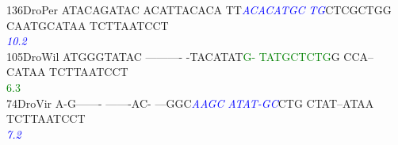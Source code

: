 \documentclass[11pt,twoside,reqno,a4paper]{article}
\begin{document}
{136\hspace*{1\charwidth}DroPer	ATACAGATAC	ACATTACACA	TT\textit{\textcolor{Blue}{A}}\textit{\textcolor{Blue}{C}}\textit{\textcolor{Blue}{A}}\textit{\textcolor{Blue}{C}}\textit{\textcolor{Blue}{A}}\textit{\textcolor{Blue}{T}}\textit{\textcolor{Blue}{G}}\textit{\textcolor{Blue}{C}}	\textit{\textcolor{Blue}{T}}\textit{\textcolor{Blue}{G}}CTCGCTGG	CAATGCATAA	TCTTAATCCT	\\
\hspace*{4\charwidth}\hspace*{7\charwidth}\hspace*{1\charwidth}\hspace*{1\charwidth}\hspace*{22\charwidth}\textit{\textcolor{Blue}{10.2}}\hspace*{1\charwidth}\hspace*{1\charwidth}\hspace*{1\charwidth}\hspace*{1\charwidth}\\
105\hspace*{1\charwidth}DroWil	ATGGGTATAC	----------	-TACATAT\textcolor{Green}{G}\textcolor{Green}{-}	\textcolor{Green}{T}\textcolor{Green}{A}\textcolor{Green}{T}\textcolor{Green}{G}\textcolor{Green}{C}\textcolor{Green}{T}\textcolor{Green}{C}\textcolor{Green}{T}\textcolor{Green}{G}G	CCA--CATAA	TCTTAATCCT	\\
\hspace*{4\charwidth}\hspace*{7\charwidth}\hspace*{1\charwidth}\hspace*{1\charwidth}\hspace*{28\charwidth}\textcolor{Green}{6.3}\hspace*{1\charwidth}\hspace*{1\charwidth}\hspace*{1\charwidth}\hspace*{1\charwidth}\\
74\hspace*{2\charwidth}DroVir	A-G-------	-------AC-	---GGC\textit{\textcolor{Blue}{A}}\textit{\textcolor{Blue}{A}}\textit{\textcolor{Blue}{G}}\textit{\textcolor{Blue}{C}}	\textit{\textcolor{Blue}{A}}\textit{\textcolor{Blue}{T}}\textit{\textcolor{Blue}{A}}\textit{\textcolor{Blue}{T}}\textit{\textcolor{Blue}{-}}\textit{\textcolor{Blue}{G}}\textit{\textcolor{Blue}{C}}CTG	CTAT--ATAA	TCTTAATCCT	\\
\hspace*{4\charwidth}\hspace*{7\charwidth}\hspace*{1\charwidth}\hspace*{1\charwidth}\hspace*{26\charwidth}\textit{\textcolor{Blue}{7.2}}\hspace*{1\charwidth}\hspace*{1\charwidth}\hspace*{1\charwidth}\hspace*{1\charwidth}\\
}
\end{document}
